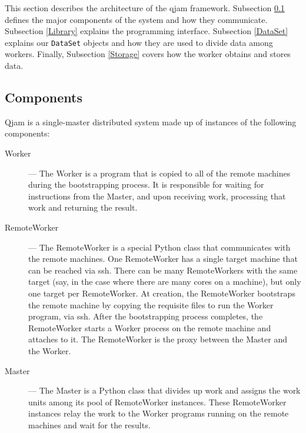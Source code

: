 \documentclass[%
  final,
  notitlepage,
  narroweqnarray,
  inline,
]{ieee}
\begin{document}
This section describes the architecture of the qjam framework. Subsection
\ref{Components} defines the major components of the system and how they
communicate. Subsection \ref{Library} explains the programming
interface. Subsection \ref{DataSet} explains our \texttt{DataSet} objects and
how they are used to divide data among workers. Finally, Subsection
\ref{Storage} covers how the worker obtains and stores data.

\subsection{Components}
\label{Components}

Qjam is a single-master distributed system made up of instances of the
following components: \\

\begin{description}
  \item[Worker] --- The Worker is a program that is copied to all of the remote
    machines during the bootstrapping process. It is responsible for waiting
    for instructions from the Master, and upon receiving work, processing that
    work and returning the result. \\

  \item[RemoteWorker] --- The RemoteWorker is a special Python class that
    communicates with the remote machines. One RemoteWorker has a single target
    machine that can be reached via ssh. There can be many RemoteWorkers with
    the same target (say, in the case where there are many cores on a machine),
    but only one target per RemoteWorker. At creation, the RemoteWorker
    bootstraps the remote machine by copying the requisite files to run the
    Worker program, via ssh. After the bootstrapping process completes, the
    RemoteWorker starts a Worker process on the remote machine and attaches to
    it. The RemoteWorker is the proxy between the Master and the Worker. \\

  \item[Master] --- The Master is a Python class that divides up work and
    assigns the work units among its pool of RemoteWorker instances. These
    RemoteWorker instances relay the work to the Worker programs running on the
    remote machines and wait for the results. \\
\end{description}
\end{document}
